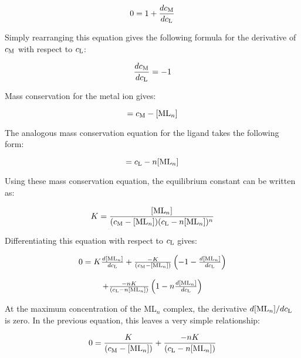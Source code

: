 \begin{equation}
0 = 1 + \frac{dc_{\text M}}{dc_{\text L}}
\end{equation}

Simply rearranging this equation gives the following formula for the derivative of  $c_{\text M}$ with respect to  $c_{\text L}$:

\begin{equation}
\frac{dc_{\text M}}{dc_{\text L}} = -1 
\end{equation}

Mass conservation for the metal ion gives:

\begin{equation}
[\text M] = c_{\text M} - [\text {ML}_n] 
\end{equation}

The analogous mass conservation equation for the ligand takes the following form:

\begin{equation}
[\text L] = c_{\text L} - n[\text {ML}_n] 
\end{equation}

Using these mass conservation equation, the equilibrium constant can be written as:

\begin{equation}
K = \frac{[ \text{ML}_n ]}{(c_{\text M} - [\text {ML}_n] )(c_{\text L} - n[\text {ML}_n])^n }
\end{equation}


Differentiating this equation with respect to $c_{\text L}$ gives:

\begin{equation}
\begin{array}{cccc}
0 = K \frac{d[ \text{ML}_n ]}{dc_{\text L}} + \frac{-K}{(c_{\text M} - [\text {ML}_n] )} \left ( -1 - \frac{d[ \text{ML}_n ]}{dc_{\text L}} \right )
\\{}\\
 + \frac{-nK}{(c_{\text L} - n[\text {ML}_n])} \left ( 1 - n \frac{d[ \text{ML}_n ]}{dc_{\text L}} \right )
\end{array}
\end{equation}

At the maximum concentration of the ML$_n$ complex, the derivative $d[ \text{ML}_n ] / dc_{\text L}$ is zero. In the previous equation, this leaves a very simple relationship:

\begin{equation}
0 = \frac{K}{(c_{\text M} - [\text {ML}_n] )}  + \frac{-nK}{(c_{\text L} - n[\text {ML}_n])} 
\end{equation}

